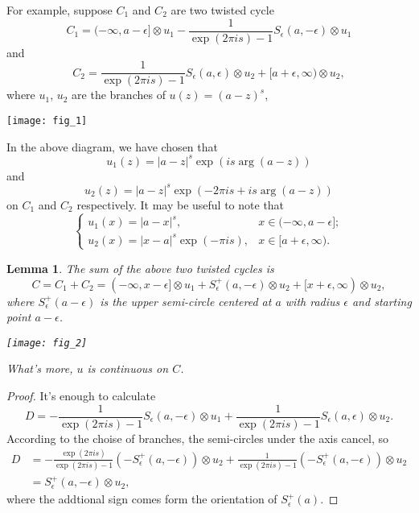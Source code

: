 \documentclass[11pt]{article}
\DeclareMathOperator{\Arg}{Arg}
\theoremstyle{definition}
\theoremstyle{plain}
\newtheorem{lem}[para]{Lemma}
\begin{document}
For example, suppose $C_1$ and $C_2$ are two twisted cycle 
\[
	C_1=(-\infty,a-\epsilon]\otimes u_1-
	\frac{1}{\exp(2\pi is)-1}S_{\epsilon}(a,-\epsilon)\otimes u_1
\]
and 
\[
	C_2=\frac{1}{\exp(2\pi is)-1}S_{\epsilon}(a,\epsilon)\otimes u_2+[a+\epsilon,\infty) \otimes u_2,
\]
where $u_1$, $u_2$ are the branches of $u(z)=(a-z)^{s}$, 
\begin{center}
\texttt{[image: fig\_1]}
\end{center}

In the above diagram, we have chosen that
\[
	u_1(z)=|a-z|^s\exp(is \arg(a-z))
\]
and 
\[
	u_2(z)=|a-z|^s\exp(-2\pi is+is \arg(a-z))
\]
on $C_1$ and $C_2$ respectively.
It may be useful to note that
\begin{equation}
	\begin{cases}
	u_1(x)=|a-x|^s, & x\in  (-\infty,a-\epsilon];\\
	u_2(x)=|x-a|^s \exp(-\pi i s),& x\in [a+\epsilon,\infty).
	\end{cases}
\end{equation}

\begin{lem}\label{lem:1}
The sum of the above two twisted cycles is
\[
	C=C_1+C_2=(-\infty,x-\epsilon]\otimes u_1+
	S^+_{\epsilon}(a,-\epsilon)\otimes u_2+
	[x+\epsilon,\infty) \otimes u_2,
\]
where $S^+_\epsilon(a-\epsilon)$ is the upper semi-circle 
centered at $a$ with radius $\epsilon$ and starting point $a-\epsilon$.
\begin{center}
\texttt{[image: fig\_2]}
\end{center}
What's more, $u$ is continuous on $C$.
\end{lem}

\begin{proof}
It's enough to calculate
\[
	D=-\frac{1}{\exp(2\pi is)-1}S_{\epsilon}(a,-\epsilon)\otimes u_1+\frac{1}{\exp(2\pi is)-1}S_{\epsilon}(a,\epsilon)\otimes u_2.
\]
According to the choise of branches, the semi-circles under the axis cancel, so
\begin{align*}
D&=-\frac{\exp(2\pi i s)}{\exp(2\pi is)-1}(-S^+_{\epsilon}(a,-\epsilon))\otimes u_2+\frac{1}{\exp(2\pi is)-1}(-S^+_{\epsilon}(a,-\epsilon))\otimes u_2\\
&=S^+_{\epsilon}(a,-\epsilon)\otimes u_2,
\end{align*}
where the addtional sign comes form the orientation of $S^+_{\epsilon}(a)$.
\end{proof}
\end{document}
